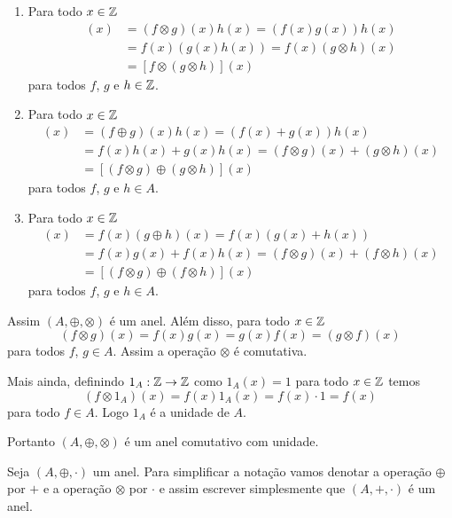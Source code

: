 \begin{exemplos}
\begin{enumerate}[label={\arabic*})]
\begin{enumerate}[label={\roman*})]
            \item Para todo $x \in \mathbb{Z}$
            \begin{align*}
                [(f \otimes g)\otimes h](x) &= (f \otimes g)(x)h(x) = (f(x)g(x))h(x)\\ &= f(x)(g(x)h(x)) = f(x)(g \otimes h)(x)\\ &= [f\otimes (g \otimes h)](x)
            \end{align*}
            para todos $f$, $g$ e $h \in \mathbb{Z}$.

            \item Para todo $x \in \mathbb{Z}$
            \begin{align*}
                [(f \oplus g)\otimes h](x) &= (f \oplus g)(x)h(x) = (f(x) + g(x))h(x) \\ &= f(x)h(x) + g(x)h(x)
                = (f\otimes g)(x) + (g \otimes h)(x)\\
                &= [(f \otimes g) \oplus (g \otimes h)](x)
            \end{align*}
            para todos $f$, $g$ e $h \in A$.

            \item Para todo $x \in \mathbb{Z}$
            \begin{align*}
                [f\otimes (g \oplus h)](x) &= f(x)(g\oplus h)(x) = f(x)(g(x) + h(x))\\
                &= f(x)g(x) + f(x)h(x) = (f\otimes g)(x) + (f\otimes h)(x)\\
                &= [(f \otimes g) \oplus (f\otimes h)](x)
            \end{align*}
            para todos $f$, $g$ e $h \in A$.
        \end{enumerate}
        Assim $(A, \oplus, \otimes)$ \'e um anel. Al\'em disso, para todo $x \in \mathbb{Z}$
        \[
            (f\otimes g)(x) = f(x)g(x) = g(x)f(x) = (g\otimes f)(x)
        \]
        para todos $f$, $g \in A$. Assim a opera\c{c}\~ao $\otimes$ \'e comutativa.

        Mais ainda, definindo $1_A : \mathbb{Z} \to \mathbb{Z}$ como $1_A(x) = 1$ para todo $x \in \mathbb{Z}$ temos
        \[
            (f \otimes 1_A)(x) = f(x)1_A(x) = f(x)\cdot 1 = f(x)
        \]
        para todo $f \in A$. Logo $1_A$ \'e a unidade de $A$.

        Portanto $(A, \oplus, \otimes)$ \'e um anel comutativo com unidade.
    \end{enumerate}
\end{exemplos}

\begin{observacao}
    Seja $(A, \oplus, \cdot)$ um anel. Para simplificar a nota\c{c}\~ao vamos denotar a opera\c{c}\~ao $\oplus$
    por $+$ e a opera\c{c}\~ao $\otimes$ por $\cdot$ e assim escrever simplesmente que $(A, +, \cdot)$ \'e um anel.
\end{observacao}

